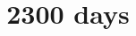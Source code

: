 \documentclass[]{book}
\begin{document}
\title{2300 days}

\maketitle

\tableofcontents




\end{document}
